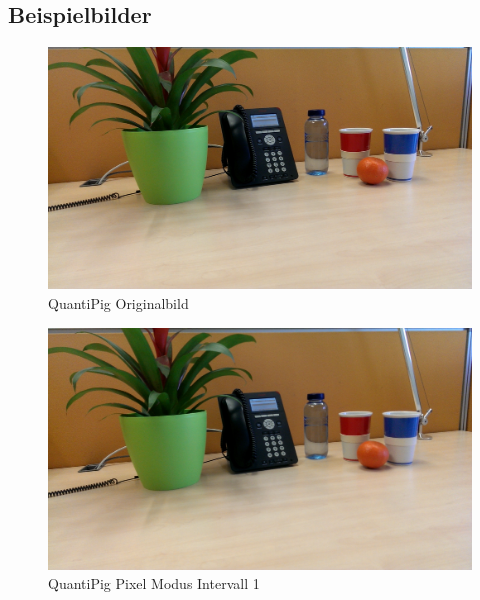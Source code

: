 \subsection{Beispielbilder}
\begin{landscape}


\begin{figure}[h]
	\centering
		\includegraphics[width=1.4\textwidth]{img/Fotos/QuantiPig_Original.png}
	\caption[QuantiPig Originalbild]{QuantiPig Originalbild}
	\label{fig:pig_original}
\end{figure}

\begin{figure}[h]
	\centering
		\includegraphics[width=1.4\textwidth]{img/Fotos/QuantiPig_Pixel_1.png}
	\caption[QuantiPig Pixel Modus Intervall 1]{QuantiPig Pixel Modus Intervall 1}
	\label{fig:pig_pix1}
\end{figure}


\end{landscape}
